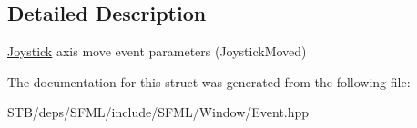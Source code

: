 \subsection{Detailed Description}
\hyperlink{classsf_1_1_joystick}{Joystick} axis move event parameters (Joystick\+Moved) 

The documentation for this struct was generated from the following file\+:\begin{DoxyCompactItemize}
\item 
S\+T\+B/deps/\+S\+F\+M\+L/include/\+S\+F\+M\+L/\+Window/Event.\+hpp\end{DoxyCompactItemize}
